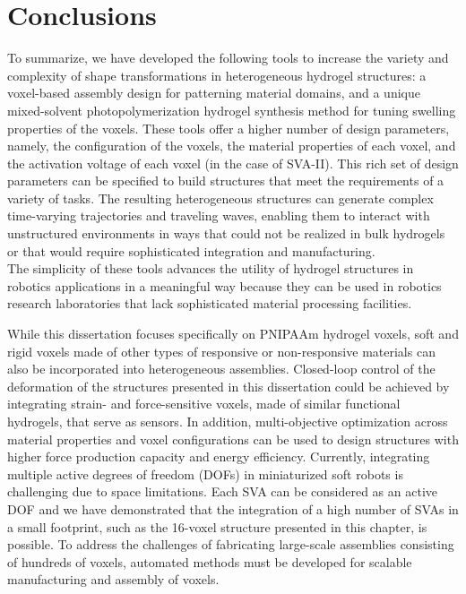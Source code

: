\section{Conclusions}
To summarize, we have developed the following tools to increase the variety and complexity of shape transformations in heterogeneous hydrogel structures: a voxel-based assembly design for patterning material domains, and a unique mixed-solvent photopolymerization hydrogel synthesis method for tuning swelling properties of the voxels. These tools offer a higher number of design parameters, namely, the configuration of the voxels, the material properties of each voxel, and the activation voltage of each voxel (in the case of SVA-II). This rich set of design parameters can be specified to build structures that meet the requirements of a variety of tasks. The resulting heterogeneous structures can generate complex time-varying trajectories and traveling waves, enabling them to interact with unstructured environments in ways that could not be realized in bulk hydrogels or that would require sophisticated integration and manufacturing.\\

The simplicity of these tools advances the utility of hydrogel structures in robotics applications in a meaningful way because they can be used in robotics research laboratories that lack sophisticated material processing facilities.

While this dissertation focuses specifically on PNIPAAm hydrogel voxels, soft and rigid voxels made of other types of responsive or non-responsive materials can also be incorporated into heterogeneous assemblies. Closed-loop control of the deformation of the structures presented in this dissertation could be achieved by integrating strain- and force-sensitive voxels, made of similar functional hydrogels, that serve as sensors. In addition, multi-objective optimization across material properties and voxel configurations can be used to design structures with higher force production capacity and %
energy efficiency. Currently, integrating multiple active degrees of freedom (DOFs) in miniaturized soft robots is challenging due to space limitations. Each SVA can be considered as an active DOF and we have demonstrated that the integration of a high number of SVAs in a small footprint, such as the 16-voxel structure presented in this chapter, is possible. To address the challenges of fabricating large-scale 
assemblies consisting of hundreds of voxels, %
automated methods must be developed for scalable manufacturing and assembly of voxels.